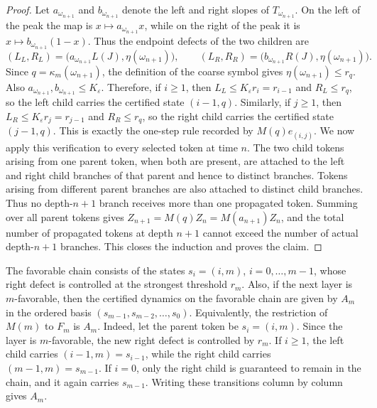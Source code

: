 \documentclass[11pt]{amsart}
\numberwithin{equation}{section}
\theoremstyle{plain}
\theoremstyle{definition}
\theoremstyle{remark}
\begin{document}
\begin{proof}
Let \(a_{\omega_{n+1}}\) and \(b_{\omega_{n+1}}\) denote the left and right
slopes of \(T_{\omega_{n+1}}\). On the left of the peak the map is
\(x\mapsto a_{\omega_{n+1}}x\), while on the right of the peak it is
\(x\mapsto b_{\omega_{n+1}}(1-x)\). Thus the endpoint defects of the two
children are
\[
(L_L,R_L)=\bigl(a_{\omega_{n+1}}L(J),\eta(\omega_{n+1})\bigr),
\qquad
(L_R,R_R)=\bigl(b_{\omega_{n+1}}R(J),\eta(\omega_{n+1})\bigr).
\]
Since \(q=\kappa_m(\omega_{n+1})\), the definition of the coarse symbol gives
\(\eta(\omega_{n+1})\le r_q\). Also
\(a_{\omega_{n+1}},b_{\omega_{n+1}}\le K_\varepsilon\). Therefore, if
\(i\ge1\), then
\(L_L\le K_\varepsilon r_i=r_{i-1}\) and \(R_L\le r_q\), so the left child
carries the certified state \((i-1,q)\). Similarly, if \(j\ge1\), then
\(L_R\le K_\varepsilon r_j=r_{j-1}\) and \(R_R\le r_q\), so the right child
carries the certified state \((j-1,q)\). This is exactly the one-step rule
recorded by \(M(q)e_{(i,j)}\).
We now apply this verification to every selected token at time \(n\). The two
child tokens arising from one parent token, when both are present, are attached
to the left and right child branches of that parent and hence to distinct
branches. Tokens arising from different parent branches are also attached to
distinct child branches. Thus no depth-\(n+1\) branch receives more than one
propagated token. Summing over all parent tokens gives
\(Z_{n+1}=M(q)Z_n=M(a_{n+1})Z_n\), and the total number of propagated tokens
at depth \(n+1\) cannot exceed the number of actual depth-\(n+1\) branches.
This closes the induction and proves the claim.
\end{proof}






The favorable chain consists of the states \(s_i=(i,m)\), \(i=0,\dots,m-1\), whose right defect is controlled at the strongest threshold \(r_m\). Also, 
if the next layer is \(m\)-favorable, then the certified dynamics on the favorable chain are given by \(A_m\) in the ordered basis \((s_{m-1},s_{m-2},\dots,s_0)\). Equivalently, the restriction of \(M(m)\) to \(F_m\) is \(A_m\).
Indeed, let the parent token be \(s_i=(i,m)\). Since the layer is \(m\)-favorable, the new right defect is controlled by \(r_m\). If \(i\ge1\), the left child carries \((i-1,m)=s_{i-1}\), while the right child carries \((m-1,m)=s_{m-1}\). If \(i=0\), only the right child is guaranteed to remain in the chain, and it again carries \(s_{m-1}\). Writing these transitions column by column gives \(A_m\).
\end{document}

